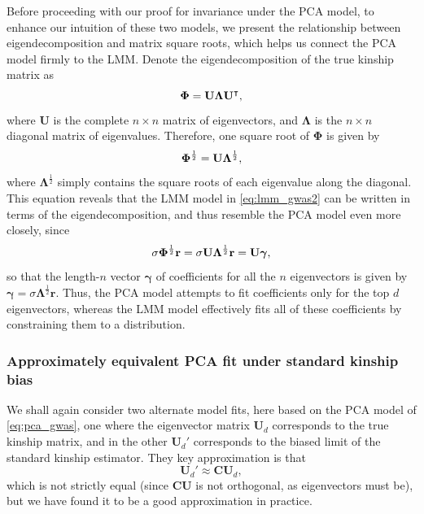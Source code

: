 \documentclass[11pt]{article}
\newcommand{\kinMat}{%
  \ensuremath{%
    \mathbf{\Phi}
  }%
  \xspace%
}%
\begin{document}
Before proceeding with our proof for invariance under the PCA model, to enhance our intuition of these two models, we present the relationship between eigendecomposition and matrix square roots, which helps us connect the PCA model firmly to the LMM.
Denote the eigendecomposition of the true kinship matrix as
$$
\kinMat = \mathbf{U} \mathbf{\Lambda} \mathbf{U}^\intercal,
$$
where $\mathbf{U}$ is the complete $n \times n$ matrix of eigenvectors, and
$\mathbf{\Lambda}$ is the $n \times n$ diagonal matrix of eigenvalues.
Therefore, one square root of \kinMat is given by
$$
\kinMat^\frac{1}{2}
=
\mathbf{U} \mathbf{\Lambda}^\frac{1}{2}
,
$$
where $\mathbf{\Lambda}^\frac{1}{2}$ simply contains the square roots of each eigenvalue along the diagonal.
This equation reveals that the LMM model in \cref{eq:lmm_gwas2} can be written in terms of the eigendecomposition, and thus resemble the PCA model even more closely, since
$$
\sigma \kinMat^\frac{1}{2} \mathbf{r}
=
\sigma \mathbf{U} \mathbf{\Lambda}^\frac{1}{2} \mathbf{r}
=
\mathbf{U} \boldsymbol{\gamma}
,
$$
so that the length-$n$ vector $\boldsymbol{\gamma}$ of coefficients for all the $n$ eigenvectors is given by
$
\boldsymbol{\gamma} = \sigma \mathbf{\Lambda}^\frac{1}{2} \mathbf{r}
$.
Thus, the PCA model attempts to fit coefficients only for the top $d$ eigenvectors, whereas the LMM model effectively fits all of these coefficients by constraining them to a distribution.

\subsubsection{Approximately equivalent PCA fit under standard kinship bias}

We shall again consider two alternate model fits, here based on the PCA model of \cref{eq:pca_gwas}, one where the eigenvector matrix $\mathbf{U}_d$ corresponds to the true kinship matrix, and in the other $\mathbf{U}_d'$ corresponds to the biased limit of the standard kinship estimator.
They key approximation is that
$$
\mathbf{U}_d' \approx \mathbf{C} \mathbf{U}_d,
$$
which is not strictly equal (since $\mathbf{C} \mathbf{U}$ is not orthogonal, as eigenvectors must be), but we have found it to be a good approximation in practice.
\end{document}
